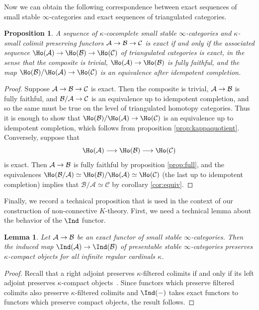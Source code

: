 \documentclass{amsart}
\renewcommand{\to}{\mathchoice{\longrightarrow}{\rightarrow}{\rightarrow}{\rightarrow}}
\let\catsymbfont\mathcal
\newcommand{\aA}{{\catsymbfont{A}}}
\newcommand{\aB}{{\catsymbfont{B}}}
\newcommand{\aC}{{\catsymbfont{C}}}
\renewcommand{\i}{\infty}
\numberwithin{equation}{section}
\newtheorem{lemma}[equation]{Lemma}
\newtheorem{proposition}[equation]{Proposition}
\theoremstyle{definition}
\begin{document}
Now we can obtain the following correspondence between exact sequences
of small stable $\i$-categories and exact sequences of triangulated
categories.

\begin{proposition}\label{prop:stabquot}
A sequence of $\kappa$-cocomplete small stable $\i$-categories and
$\kappa$-small colimit preserving functors $\aA\to\aB\to\aC$ is exact
if and only if the associated sequence
$\Ho(\aA)\to\Ho(\aB)\to\Ho(\aC)$ of triangulated categories is exact, in the sense that the composite is trivial, $\Ho(\aA)\to\Ho(\aB)$ is fully faithful, and the map $\Ho(\aB)/\Ho(\aA)\to\Ho(\aC)$ is an equivalence after idempotent completion. 
\end{proposition}

\begin{proof}
Suppose $\aA\to\aB\to\aC$ is exact.
Then the composite is trivial, $\aA\to\aB$ is fully faithful, and
$\aB/\aA\to\aC$ is an equivalence up to idempotent completion, and so
the same must be true on the level of triangulated homotopy
categories.  Thus it is enough to show that
$\Ho(\aB)/\Ho(\aA)\to\Ho(\aC)$ is an equivalence up to idempotent
completion, which follows from proposition \ref{prop:kappaquotient}.
Conversely, suppose that  
\[
\Ho(\aA)\to\Ho(\aB)\to\Ho(\aC)
\]
is exact.  Then $\aA\to\aB$ is fully faithful by
proposition \ref{prop:full}, and the equivalences
$\Ho(\aB/\aA)\simeq\Ho(\aB)/\Ho(\aA)\simeq\Ho(\aC)$ (the last up to
idempotent completion) implies that $\aB/\aA\simeq\aC$ by
corollary \ref{cor:equiv}.
\end{proof}

Finally, we record a technical proposition that is used in the context
of our construction of non-connective $K$-theory.  First, we need a
technical lemma about the behavior of the $\Ind$ functor.

\begin{lemma}\label{lem:indcpt}
Let $\aA\to\aB$ be an exact functor of small stable $\infty$-categories.
Then the induced map $\Ind(\aA)\to\Ind(\aB)$ of presentable stable
$\infty$-categories preserves $\kappa$-compact objects for all
infinite regular cardinals $\kappa$. 
\end{lemma}

\begin{proof}
Recall that a right adjoint preserves $\kappa$-filtered colimits if
and only if its left adjoint preserves $\kappa$-compact
objects~\cite[5.5.1.4]{HTT}.  Since functors which preserve filtered 
colimits also preserve $\kappa$-filtered colimits and $\Ind(-)$ takes exact
functors to functors which preserve compact objects, the result
follows.
\end{proof}
\end{document}
